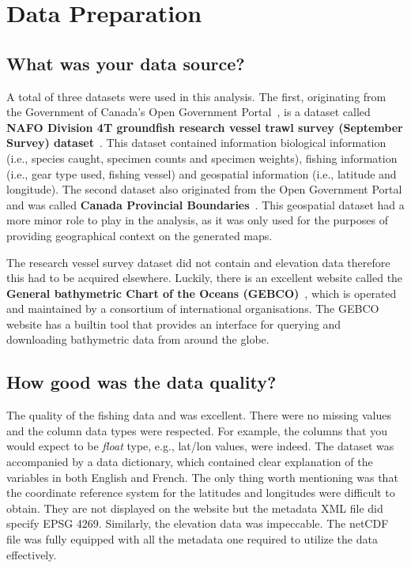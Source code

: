 \section{Data Preparation}

\subsection{What was your data source?}

A total of three datasets were used in this analysis.
The first, originating from the Government of Canada's Open Government Portal~\cite{ogp}, is a dataset called
\textbf{NAFO Division 4T groundfish research vessel trawl survey (September Survey) dataset}~\cite{groundfish}.
This dataset contained information biological information (i.e., species caught, specimen counts and specimen weights),
fishing information (i.e., gear type used, fishing vessel) and geospatial information (i.e., latitude and longitude).
The second dataset also originated from the Open Government Portal and was called \textbf{Canada Provincial Boundaries}~\cite{canmap}.
This geospatial dataset had a more minor role to play in the analysis, as it was only used for the purposes of providing geographical context on the generated maps.

The research vessel survey dataset did not contain and elevation data therefore this had to be acquired elsewhere.
Luckily, there is an excellent website called the \textbf{General bathymetric Chart of the Oceans (GEBCO)}~\cite{gebco},
which is operated and maintained by a consortium of international organisations.
The GEBCO website has a builtin tool that provides an interface for querying and downloading bathymetric data from around the globe.

\subsection{How good was the data quality?}

The quality of the fishing data and was excellent.
There were no missing values and the column data types were respected.
For example, the columns that you would expect to be \textit{float} type, e.g., lat/lon values, were indeed.
The dataset was accompanied by a data dictionary, which contained clear explanation of the variables in both English and French.
The only thing worth mentioning was that the coordinate reference system for the latitudes and longitudes were difficult to obtain.
They are not displayed on the website but the metadata XML file did specify EPSG 4269.
Similarly, the elevation data was impeccable.
The netCDF file was fully equipped with all the metadata one required to utilize the data effectively.

